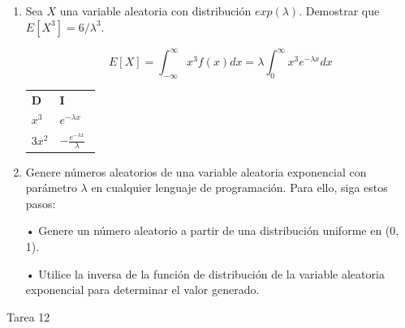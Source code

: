 \documentclass[a4paper, 12pt]{article}
\newcommand{\Pspace}{0.5cm}
\newcommand{\Aspace}{0.2cm}
\begin{document}
\begin{enumerate}
        \vspace{\Pspace}
    \item Sea $X$ una variable aleatoria con distribución $exp(\lambda)$. Demostrar que $E[X^{3}] = 6  / \lambda^{3}$.
            \vspace{\Aspace} \par
            { \color{azul} 
                \[
                    E[X] 
                    = \int_{-\infty}^{\infty} x^{3}f(x)dx
                    = \lambda \int_{0}^{\infty} x^{3}e^{-\lambda x}dx
                \]
                \begin{center}
                    \begin{tabular}{ll}
                        \textbf{D}  &   \textbf{I} \\
                        $x^{3}$     &   $e^{-\lambda x}$ \\
                        $3x^{2}$    &   $-\frac{e^{-\lambda x}}{\lambda}$
                        $$
                    \end{tabular}
                \end{center}
            }

        \newpage
        \item Genere números aleatorios de una variable aleatoria exponencial con parámetro $\lambda$ en cualquier lenguaje de programación. Para ello, siga estos pasos: \par
        • Genere un número aleatorio a partir de una distribución uniforme en (0, 1). \par
        • Utilice la inversa de la función de distribución de la variable aleatoria exponencial para determinar el valor generado.
            \vspace{\Aspace} \par
            { \color{azul}  }
    \end{enumerate}



    \newpage
    \vspace{0.3cm}

    \begin{center}
        { \LARGE Tarea 12}
    \end{center}
\end{document}
